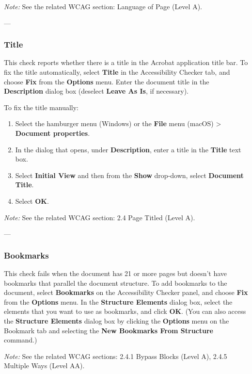 \vspace{0.5em}
\noindent\textit{Note:} See the related WCAG section: Language of Page (Level A)\footnotemark[1].

---

\subsubsection*{Title}
This check reports whether there is a title in the Acrobat application title bar\footnotemark[1].
To fix the title automatically, select \textbf{Title} in the Accessibility Checker tab, and choose \textbf{Fix} from the \textbf{Options} menu. Enter the document title in the \textbf{Description} dialog box (deselect \textbf{Leave As Is}, if necessary).

To fix the title manually:
\begin{enumerate}
    \item Select the hamburger menu (Windows) or the \textbf{File} menu (macOS) > \textbf{Document properties}.
    \item In the dialog that opens, under \textbf{Description}, enter a title in the \textbf{Title} text box.
    \item Select \textbf{Initial View} and then from the \textbf{Show} drop-down, select \textbf{Document Title}.
    \item Select \textbf{OK}.
\end{enumerate}

\vspace{0.5em}
\noindent\textit{Note:} See the related WCAG section: 2.4 Page Titled (Level A)\footnotemark[1].

---

\subsubsection*{Bookmarks}
This check fails when the document has 21 or more pages but doesn't have bookmarks that parallel the document structure\footnotemark[1].
To add bookmarks to the document, select \textbf{Bookmarks} on the Accessibility Checker panel, and choose \textbf{Fix} from the \textbf{Options} menu. In the \textbf{Structure Elements} dialog box, select the elements that you want to use as bookmarks, and click \textbf{OK}. (You can also access the \textbf{Structure Elements} dialog box by clicking the \textbf{Options} menu on the Bookmark tab and selecting the \textbf{New Bookmarks From Structure} command.)

\vspace{0.5em}
\noindent\textit{Note:} See the related WCAG sections: 2.4.1 Bypass Blocks (Level A), 2.4.5 Multiple Ways (Level AA)\footnotemark[1].

